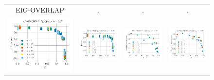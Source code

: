 \begin{figure}
	\centering
	\begin{tabular}{@{\hskip -0.0in}c@{\hskip -0.0in}c@{\hskip -0.0in}c@{\hskip -0.0in}c@{\hskip -0.0in}}
		EIG-OVERLAP & . & . & . \\
		\includegraphics[width=.245\linewidth]{figures/glove-wiki400k-am_qa_best-f1_vs_subspace-eig-overlap_linx.pdf} &
		\includegraphics[width=.245\linewidth]{figures/glove-wiki400k-am_sentiment_trec_test-acc_vs_subspace-eig-overlap_linx.pdf} &
		\includegraphics[width=.245\linewidth]{figures/glove-wiki400k-am_intrinsics_analogy-avg-score_vs_subspace-eig-overlap_linx.pdf} &
		\includegraphics[width=.245\linewidth]{figures/glove-wiki400k-am_intrinsics_similarity-avg-score_vs_subspace-eig-overlap_linx.pdf} \\
		

\end{tabular}
\end{figure}
